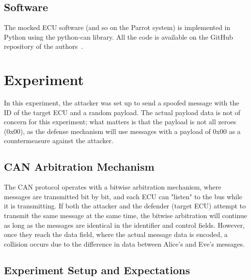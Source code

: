 \documentclass[10pt,twocolumn,letterpaper]{article}
\begin{document}
\subsection{Software}
The mocked ECU software (and so on the Parrot system) is implemented in Python using the python-can library.
All the code is available on the GitHub repository of the authors~\cite{parrot_github}.

\section{Experiment}

In this experiment, the attacker was set up to send a spoofed message with the ID of the target ECU and a random payload. The actual payload data is not of concern for this experiment; what matters is that the payload is not all zeroes (0x00), as the defense mechanism will use messages with a payload of 0x00 as a countermeasure against the attacker.

\subsection{CAN Arbitration Mechanism}

The CAN protocol operates with a bitwise arbitration mechanism, where messages are transmitted bit by bit, and each ECU can "listen" to the bus while it is transmitting. If both the attacker and the defender (target ECU) attempt to transmit the same message at the same time, the bitwise arbitration will continue as long as the messages are identical in the identifier and control fields. However, once they reach the data field, where the actual message data is encoded, a collision occurs due to the difference in data between Alice’s and Eve’s messages.

\subsection{Experiment Setup and Expectations}
\end{document}
